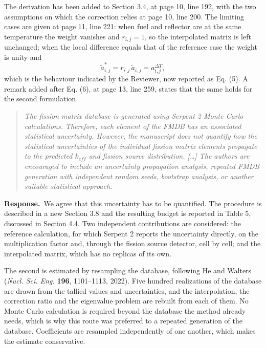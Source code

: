 \documentclass[11pt]{article}
\newenvironment{reviewer}%
  {\medskip\begin{quote}\itshape\color{black!70}}%
  {\end{quote}}
\newcommand{\answer}{\textbf{Response.}\ }
\begin{document}
The derivation has been added to Section 3.4, at page 10, line 192, with the two assumptions on which the correction relies at page 10, line 200. The limiting cases are given at page 11, line 221: when fuel and reflector are at the same temperature the weight vanishes and $r_{i,j}=1$, so the interpolated matrix is left unchanged; when the local difference equals that of the reference case the weight is unity and
%
\begin{equation*}
\tilde{a}^{*}_{i,j} = r_{i,j}\,\tilde{a}_{i,j} = a^{\Delta T}_{i,j} ,
\end{equation*}
%
which is the behaviour indicated by the Reviewer, now reported as Eq. (5). A remark added after Eq. (6), at page 13, line 259, states that the same holds for the second formulation.
\begin{reviewer}
The fission matrix database is generated using Serpent 2 Monte Carlo calculations. Therefore, each element of the FMDB has an associated statistical uncertainty. However, the manuscript does not quantify how the statistical uncertainties of the individual fission matrix elements propagate to the predicted $k_{eff}$ and fission source distribution. [\ldots] The authors are encouraged to include an uncertainty propagation analysis, repeated FMDB generation with independent random seeds, bootstrap analysis, or another suitable statistical approach.
\end{reviewer}

\answer We agree that this uncertainty has to be quantified. The procedure is described in a new Section 3.8 and the resulting budget is reported in Table 5, discussed in Section 4.4. Two independent contributions are considered: the reference calculation, for which Serpent 2 reports the uncertainty directly, on the multiplication factor and, through the fission source detector, cell by cell; and the interpolated matrix, which has no replicas of its own.

The second is estimated by resampling the database, following He and Walters (\textit{Nucl. Sci. Eng.} \textbf{196}, 1101--1113, 2022). Five hundred realizations of the database are drawn from the tallied values and uncertainties, and the interpolation, the correction ratio and the eigenvalue problem are rebuilt from each of them. No Monte Carlo calculation is required beyond the database the method already needs, which is why this route was preferred to a repeated generation of the database. Coefficients are resampled independently of one another, which makes the estimate conservative.
\end{document}
